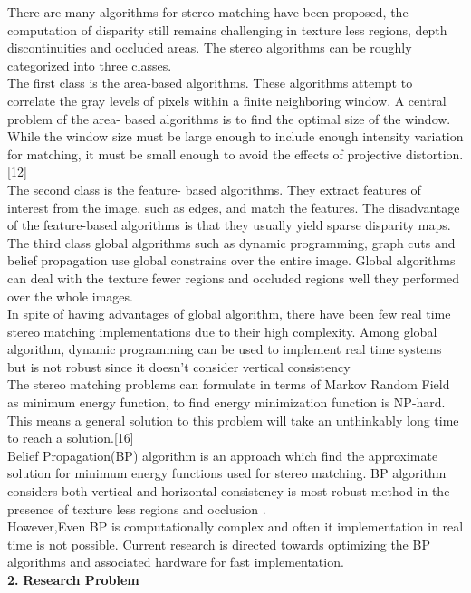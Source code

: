 {{{There are many algorithms for stereo matching have been proposed, the computation of disparity still remains challenging in texture less regions, depth discontinuities and occluded areas. The stereo algorithms can be roughly categorized into three classes.\\
The first class is the area-based algorithms. These algorithms attempt to correlate the gray levels of pixels within a finite neighboring window. A central problem of the area- based algorithms is to find the optimal size of the window. While the window size must be large enough to include enough intensity variation for matching, it must be small enough to avoid the effects of projective distortion.[12]\\ 
The second class is the feature- based algorithms. They extract features of interest from the image, such as edges, and match the features. The disadvantage of the feature-based algorithms is that they usually yield sparse disparity maps.\\
The third class global algorithms such as dynamic programming, graph cuts and belief propagation use global constrains over the entire image. Global algorithms can deal with the texture fewer regions and occluded regions well they performed over the whole images.\\
In spite of having advantages of global algorithm, there have been few real time stereo matching implementations due to their high complexity. Among global algorithm, dynamic programming can be used to implement real time systems but is not robust since it doesn't consider vertical consistency\\
The stereo matching problems can formulate in terms of Markov Random Field as minimum energy function, to find energy minimization function is NP-hard. This means a general solution to this problem will take an unthinkably long time to reach a solution.[16]\\
Belief Propagation(BP) algorithm is an approach which find the approximate solution for minimum energy functions used for stereo matching.
BP algorithm considers both vertical and horizontal consistency is most robust method in the presence of texture less regions and occlusion .\\
However,Even  BP is computationally complex and often it implementation in real time is not possible.
Current research is directed towards optimizing the BP algorithms and associated hardware for fast implementation.\\
{\Large\textbf{2.} \vspace{0.5in} {\Large\textbf{Research Problem}\\
}}}}}
